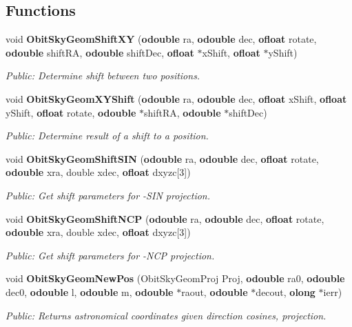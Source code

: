 \subsection*{Functions}
\begin{CompactItemize}
\item 
void {\bf Obit\-Sky\-Geom\-Shift\-XY} ({\bf odouble} ra, {\bf odouble} dec, {\bf ofloat} rotate, {\bf odouble} shift\-RA, {\bf odouble} shift\-Dec, {\bf ofloat} $\ast$x\-Shift, {\bf ofloat} $\ast$y\-Shift)
\begin{CompactList}\small\item\em Public: Determine shift between two positions. \item\end{CompactList}\item 
void {\bf Obit\-Sky\-Geom\-XYShift} ({\bf odouble} ra, {\bf odouble} dec, {\bf ofloat} x\-Shift, {\bf ofloat} y\-Shift, {\bf ofloat} rotate, {\bf odouble} $\ast$shift\-RA, {\bf odouble} $\ast$shift\-Dec)
\begin{CompactList}\small\item\em Public: Determine result of a shift to a position. \item\end{CompactList}\item 
void {\bf Obit\-Sky\-Geom\-Shift\-SIN} ({\bf odouble} ra, {\bf odouble} dec, {\bf ofloat} rotate, {\bf odouble} xra, double xdec, {\bf ofloat} dxyzc[3])
\begin{CompactList}\small\item\em Public: Get shift parameters for -SIN projection. \item\end{CompactList}\item 
void {\bf Obit\-Sky\-Geom\-Shift\-NCP} ({\bf odouble} ra, {\bf odouble} dec, {\bf ofloat} rotate, {\bf odouble} xra, double xdec, {\bf ofloat} dxyzc[3])
\begin{CompactList}\small\item\em Public: Get shift parameters for -NCP projection. \item\end{CompactList}\item 
void {\bf Obit\-Sky\-Geom\-New\-Pos} (Obit\-Sky\-Geom\-Proj Proj, {\bf odouble} ra0, {\bf odouble} dec0, {\bf odouble} l, {\bf odouble} m, {\bf odouble} $\ast$raout, {\bf odouble} $\ast$decout, {\bf olong} $\ast$ierr)
\begin{CompactList}\small\item\em Public: Returns astronomical coordinates given direction cosines, projection. \item\end{CompactList}\item 

\end{CompactItemize}
